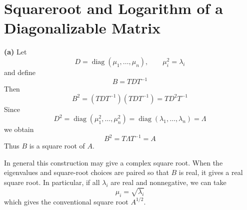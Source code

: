 \section{Squareroot and Logarithm of a Diagonalizable Matrix}





\textbf{(a)}
Let
\[
D=\operatorname{diag}(\mu_1,\ldots,\mu_n),
\qquad
\mu_i^2=\lambda_i
\]
and define
\[
B=TDT^{-1}
\]
Then
\[
B^2
=(TDT^{-1})(TDT^{-1})
=TD^2T^{-1}
\]
Since
\[
D^2
=\operatorname{diag}(\mu_1^2,\ldots,\mu_n^2)
=\operatorname{diag}(\lambda_1,\ldots,\lambda_n)
=\Lambda
\]
we obtain
\[
\boxed{B^2=T\Lambda T^{-1}=A}
\]
Thus \(B\) is a square root of \(A\).

In general this construction may give a complex square root. When the
eigenvalues and square-root choices are paired so that \(B\) is real, it gives
a real square root. In particular, if all \(\lambda_i\) are real and
nonnegative, we can take
\[
\mu_i=\sqrt{\lambda_i}
\]
which gives the conventional square root \(A^{1/2}\).

